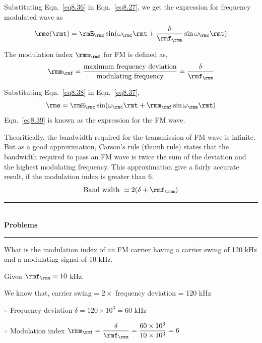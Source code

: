 Substituting Eqn.~\eqref{eq8.36} in Eqn.~\eqref{eq8.27}, we get the
expression for frequency modulated wave as
\begin{equation}
\rme(\rmt) = \rmE_\rmc \sin (\omega_\rmc \rmt + \frac{\delta}{\rmf_\rmm} \sin \omega_\rmc \rmt)\label{eq8.37}
\end{equation}

The modulation index $\rmm_\rmf$ for FM is defined as,
\begin{equation}
\rmm_\rmf = \frac{\text{maximum frequency deviation}}{\text{modulating
frequency}} = \frac{\delta}{\rmf_\rmm}\label{eq8.38}
\end{equation}

Substituting Eqn.~\eqref{eq8.38} in Eqn.~\eqref{eq8.37},
\begin{equation}
\rme = \rmE_\rmc \sin (\omega_\rmc \rmt
+ \rmm_\rmf \sin \omega_\rmm \rmt)\label{eq8.39}
\end{equation}
Eqn.~\eqref{eq8.39} is known as the expression  for the FM wave.


Theoritically, the bandwidth required for the transmission of FM wave
is infinite. But as a good approximation, Carson's rule (thumb rule)
states that the bandwidth required to pass an FM wave is twice the sum
of the deviation and the highest modulating frequency. This
approximation give a fairly accurate result, if the modulation index
is greater than 6.
\begin{equation}
\text{Band width } \simeq 2(\delta + \rmf_\rmm)\label{eq8.40}
\end{equation}


\begin{center}
\rule{4cm}{1pt}\\
{\bf\Large Problems}\\[-3pt]
\rule{4cm}{1pt}
\end{center}

\begin{problem}\label{prob8.19}
What is the modulation index of an FM carrier having a carrier swing
of 120 kHz and a modulating signal of 10 kHz.
\end{problem}

\begin{solution}
Given $\rmf_\rmm =  10$ kHz.

\smallskip
We know that, carrier swing = $2 \times$ frequency deviation = 120 kHz

\smallskip
$\therefore$ Frequency deviation $\delta = 120 \times 10^3 = 60$ kHz

\smallskip
$\therefore$ Modulation index $\rmm_\rmf = \dfrac{\delta}{\rmf_\rmm}
= \dfrac{60 \times 10^3}{10 \times 10^3} = 6$
\end{solution}

